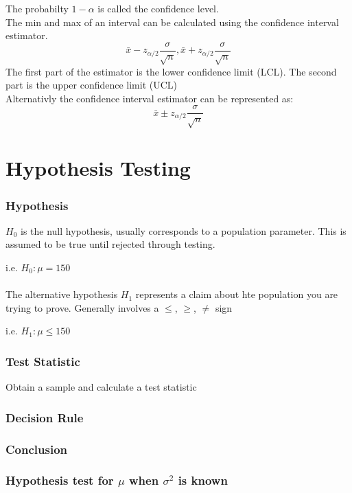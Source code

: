 \documentclass{article}
\begin{document}
The probabilty $1 - \alpha$  is called the confidence level.
\\

The min and max of an interval can be calculated using the confidence interval estimator.
$$
\bar{x} - z_{\alpha / 2}\frac{\sigma}{\sqrt{n}}, \bar{x} + z_{\alpha / 2}\frac{\sigma}{\sqrt{n}}
$$
The first part of the estimator is the lower confidence limit (LCL). The second part is the upper confidence limit (UCL)
\\

Alternativly the confidence interval estimator can be represented as:
$$
\bar{x} \pm z_{\alpha / 2}\frac{\sigma}{\sqrt{n}}
$$



\section{Hypothesis Testing}

\subsubsection{Hypothesis}
$H_0$ is the null hypothesis, usually corresponds to a population parameter. This is assumed to be true until rejected through testing.

i.e. $H_0 : \mu = 150$
\\
\\
The alternative hypothesis $H_1$ represents a claim about hte population you are trying to prove. Generally involves a $\leq$, $\geq$, $\neq$ sign

i.e. $H_1 : \mu \leq 150$

\subsubsection{Test Statistic}
Obtain a sample and calculate a test statistic

\subsubsection{Decision Rule}

\subsubsection{Conclusion}

\subsubsection{Hypothesis test for $\mu$ when $\sigma^2$ is known}
\end{document}
